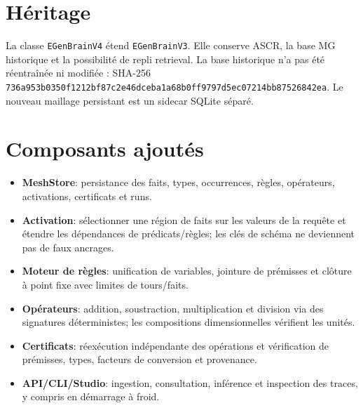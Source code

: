 \documentclass[11pt,a4paper]{book}
\begin{document}
\section{Héritage}
La classe \texttt{EGenBrainV4} étend \texttt{EGenBrainV3}. Elle conserve ASCR, la base MG historique et la possibilité de repli retrieval. La base historique n'a pas été réentraînée ni modifiée : SHA-256 \texttt{736a953b0350f121\allowbreak{}2bf87c2e46dceba1\allowbreak{}a68b0ff9797d5ec0\allowbreak{}7214bb87526842ea}. Le nouveau maillage persistant est un sidecar SQLite séparé.

\section{Composants ajoutés}
\begin{itemize}
\item \textbf{MeshStore}: persistance des faits, types, occurrences, règles, opérateurs, activations, certificats et runs.
\item \textbf{Activation}: sélectionner une région de faits sur les valeurs de la requête et étendre les dépendances de prédicats/règles; les clés de schéma ne deviennent pas de faux ancrages.
\item \textbf{Moteur de règles}: unification de variables, jointure de prémisses et clôture à point fixe avec limites de tours/faits.
\item \textbf{Opérateurs}: addition, soustraction, multiplication et division via des signatures déterministes; les compositions dimensionnelles vérifient les unités.
\item \textbf{Certificats}: réexécution indépendante des opérations et vérification de prémisses, types, facteurs de conversion et provenance.
\item \textbf{API/CLI/Studio}: ingestion, consultation, inférence et inspection des traces, y compris en démarrage à froid.
\end{itemize}
\end{document}
